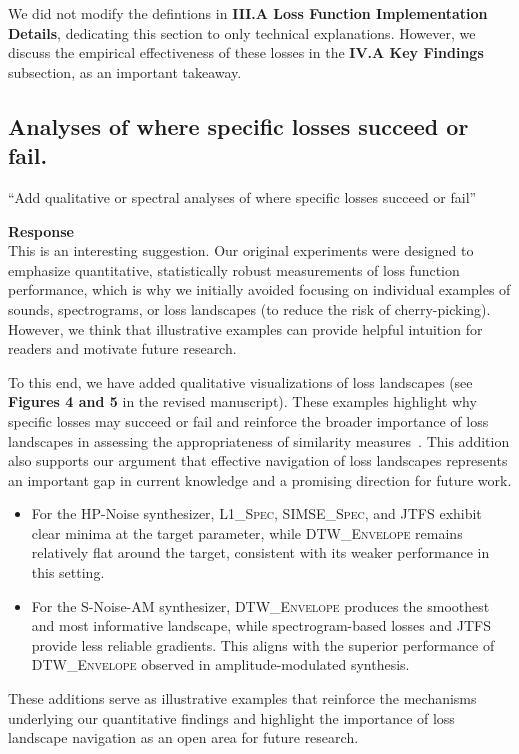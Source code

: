 \documentclass[11pt]{article}
\newcommand{\DTWEnv}{\textsc{DTW\_Envelope}}
\newcommand{\SIMSESpec}{\textsc{SIMSE\_Spec}}
\newcommand{\LoneSpec}{\textsc{L1\_Spec}}
\newcommand{\JTFS}{\textsc{JTFS}}
\begin{document}
We did not modify the defintions in \textbf{III.A Loss Function Implementation Details}, dedicating this section to only technical explanations. However, we discuss the empirical effectiveness of these losses in the \textbf{IV.A Key Findings} subsection, as an important takeaway.

\subsection*{Analyses of where specific losses succeed or fail.}
\noindent ``Add qualitative or spectral analyses of where specific losses succeed or fail''

\noindent\textbf{Response} \\
This is an interesting suggestion. Our original experiments were designed to emphasize quantitative, statistically robust measurements of loss function performance, which is why we initially avoided focusing on individual examples of sounds, spectrograms, or loss landscapes (to reduce the risk of cherry-picking). However, we think that illustrative examples can provide helpful intuition for readers and motivate future research.

To this end, we have added qualitative visualizations of loss landscapes (see \textbf{Figures 4 and 5} in the revised manuscript). These examples highlight why specific losses may succeed or fail and reinforce the broader importance of loss landscapes in assessing the appropriateness of similarity measures~\cite{vahidi2023mesostructures,turian2020sorry}. This addition also supports our argument that effective navigation of loss landscapes represents an important gap in current knowledge and a promising direction for future work.

\begin{itemize}
  \item For the HP-Noise synthesizer, \LoneSpec{}, \SIMSESpec{}, and \JTFS{} exhibit clear minima at the target parameter, while \DTWEnv{} remains relatively flat around the target, consistent with its weaker performance in this setting.
  \item For the S-Noise-AM synthesizer, \DTWEnv{} produces the smoothest and most informative landscape, while spectrogram-based losses and \JTFS{} provide less reliable gradients. This aligns with the superior performance of \DTWEnv{} observed in amplitude-modulated synthesis.
\end{itemize}

These additions serve as illustrative examples that reinforce the mechanisms underlying our quantitative findings and highlight the importance of loss landscape navigation as an open area for future research.
\end{document}
